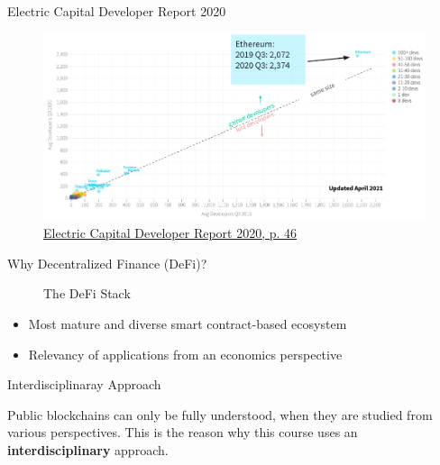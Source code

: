\documentclass[handout]{beamer}
\begin{document}
\begin{frame}{Electric Capital Developer Report 2020}
	
	\begin{figure}
		\includegraphics[width=\textwidth]{../assets/images/electric_capital}
		
		\caption{\footnotesize  \href{https://github.com/electric-capital/developer-reports}{\link Electric Capital Developer Report 2020, p. 46} \cite{EC20}} 
	\end{figure}


\end{frame}


\begin{frame}{Why Decentralized Finance (DeFi)?}

\begin{figure}[t]
	\centering	
	\resizebox{0.8\textwidth}{!}{
	\begin{tikzpicture}[scale=1.0, every node/.style={scale=1.0}]
			
	\end{tikzpicture}}
	\caption{The DeFi Stack \cite{FS:21}}
\end{figure}

\vspace{-1.0em}

\begin{itemize}
	\item Most mature and diverse smart contract-based ecosystem
	\item Relevancy of applications from an economics perspective
\end{itemize}

\end{frame}

\begin{frame}{Interdisciplinaray Approach}

	\vspace{1em}
Public blockchains can only be fully understood, when they are studied from various perspectives. This is the reason why this course uses an \color{focus} \textbf{interdisciplinary} \color{black} approach.	


\end{frame}
\end{document}
